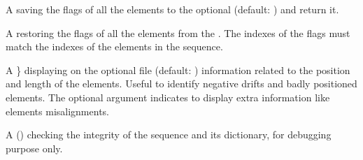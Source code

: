 \documentclass[letterpaper,10pt,english]{sphinxmanual}
\begin{document}
\begin{description}
\sphinxAtStartPar
A  \sphinxcode{\sphinxupquote{({[}flgs{]})}} saving the flags of all the elements to the optional   (default: \sphinxcode{\sphinxupquote{\{\}}}) and return it.

\sphinxAtStartPar
A   restoring the flags of all the elements from the  . The indexes of the flags must match the indexes of the elements
in the sequence.

\sphinxAtStartPar
A  \sphinxcode{\sphinxupquote{({[}fil{]}, {[}info{]})}}\} displaying on the optional file  (default: ) information related to the position and length of the elements.
Useful to identify negative drifts and badly positioned elements. The optional argument  indicates to display extra information like elements misalignments.

\sphinxAtStartPar
A  () checking the integrity of the sequence and its dictionary, for debugging purpose only.

\end{description}
\end{document}
